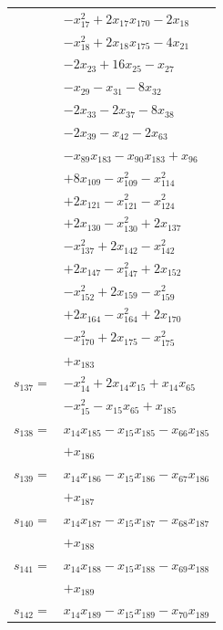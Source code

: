 \begin{longtable}{@{}r@{\;}l@{}}
 & \(\displaystyle -x_{17}^{2} +2x_{17}x_{170} -2x_{18}\) \\
 & \(\displaystyle -x_{18}^{2} +2x_{18}x_{175} -4x_{21}\) \\
 & \(\displaystyle -2x_{23} +16x_{25} -x_{27}\) \\
 & \(\displaystyle -x_{29} -x_{31} -8x_{32}\) \\
 & \(\displaystyle -2x_{33} -2x_{37} -8x_{38}\) \\
 & \(\displaystyle -2x_{39} -x_{42} -2x_{63}\) \\
 & \(\displaystyle -x_{89}x_{183} -x_{90}x_{183} +x_{96}\) \\
 & \(\displaystyle +8x_{109} -x_{109}^{2} -x_{114}^{2}\) \\
 & \(\displaystyle +2x_{121} -x_{121}^{2} -x_{124}^{2}\) \\
 & \(\displaystyle +2x_{130} -x_{130}^{2} +2x_{137}\) \\
 & \(\displaystyle -x_{137}^{2} +2x_{142} -x_{142}^{2}\) \\
 & \(\displaystyle +2x_{147} -x_{147}^{2} +2x_{152}\) \\
 & \(\displaystyle -x_{152}^{2} +2x_{159} -x_{159}^{2}\) \\
 & \(\displaystyle +2x_{164} -x_{164}^{2} +2x_{170}\) \\
 & \(\displaystyle -x_{170}^{2} +2x_{175} -x_{175}^{2}\) \\
 & \(\displaystyle +x_{183}\) \\[3pt]
\(s_{137}=\) & \(\displaystyle -x_{14}^{2} +2x_{14}x_{15} +x_{14}x_{65}\) \\
 & \(\displaystyle -x_{15}^{2} -x_{15}x_{65} +x_{185}\) \\[3pt]
\(s_{138}=\) & \(\displaystyle x_{14}x_{185} -x_{15}x_{185} -x_{66}x_{185}\) \\
 & \(\displaystyle +x_{186}\) \\[3pt]
\(s_{139}=\) & \(\displaystyle x_{14}x_{186} -x_{15}x_{186} -x_{67}x_{186}\) \\
 & \(\displaystyle +x_{187}\) \\[3pt]
\(s_{140}=\) & \(\displaystyle x_{14}x_{187} -x_{15}x_{187} -x_{68}x_{187}\) \\
 & \(\displaystyle +x_{188}\) \\[3pt]
\(s_{141}=\) & \(\displaystyle x_{14}x_{188} -x_{15}x_{188} -x_{69}x_{188}\) \\
 & \(\displaystyle +x_{189}\) \\[3pt]
\(s_{142}=\) & \(\displaystyle x_{14}x_{189} -x_{15}x_{189} -x_{70}x_{189}\) \\

\end{longtable}

